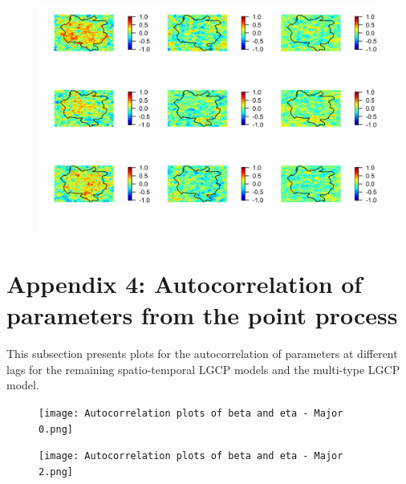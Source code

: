 \documentclass[12pt,a4paper]{report}
\begin{document}
\begin{figure}[h]
	\begin{center}
		\includegraphics{Autocorrelation in the latent field - Multi-type.png}
	\end{center}
\end{figure}

\newpage

\section*{Appendix 4: Autocorrelation of parameters from the point process}

This subsection presents plots for the autocorrelation of parameters at different lags for the remaining spatio-temporal LGCP models and the multi-type LGCP model. 

\begin{figure}[H]
\begin{center}
\texttt{[image: Autocorrelation plots of beta and eta - Major 0.png]}
\end{center}
\end{figure}

\begin{figure}[H]
\begin{center}
\texttt{[image: Autocorrelation plots of beta and eta - Major 2.png]}
\end{center}
\end{figure}
\end{document}
